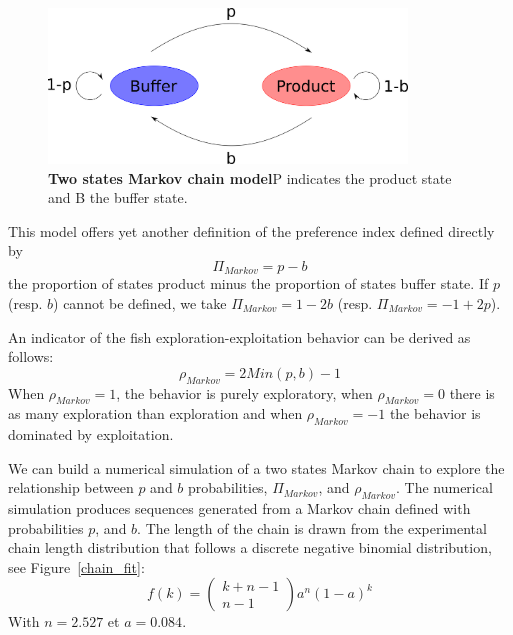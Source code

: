   \begin{figure}[h]
    \centering
    \includegraphics[width=0.85\textwidth]{part_2/assets/model.png}
    \caption{\textbf{Two states Markov chain model}P indicates the product state and B the buffer state.}
    \label{markov_model}
  \end{figure}

  This model offers yet another definition of the preference index defined directly by
  \begin{equation}
    \Pi_{Markov} = p - b
  \end{equation}
  \noindent the proportion of states product minus the proportion of states buffer state. If $p$ (resp. $b$) cannot be defined, we take $\Pi_{Markov} = 1-2b$ (resp. $\Pi_{Markov} = -1+2p$).

 An indicator of the fish exploration-exploitation behavior can be derived as follows:
  \begin{equation}
    \rho_{Markov} = 2Min(p,b) - 1
  \end{equation}
   \noindent When $\rho_{Markov} = 1$,  the  behavior is purely exploratory, when $\rho_{Markov} = 0$ there is as many exploration than exploration and when $\rho_{Markov} = -1$ the behavior is dominated by exploitation.

  We can build a numerical simulation of a two states Markov chain to explore the relationship between $p$ and $b$ probabilities, $\Pi_{Markov}$, and $\rho_{Markov}$. The numerical simulation produces sequences generated from a Markov chain defined with probabilities $p$, and $b$. The length of the chain is drawn from the experimental chain length distribution that follows a discrete negative binomial distribution, see Figure~\ref{chain_fit}:
  \begin{equation}
    f(k) = \begin{pmatrix}
    k+n-1\\
    n-1
    \end{pmatrix}
    a^n(1-a)^k
  \end{equation}
  \noindent With $n=2.527$ et $a=0.084$.

